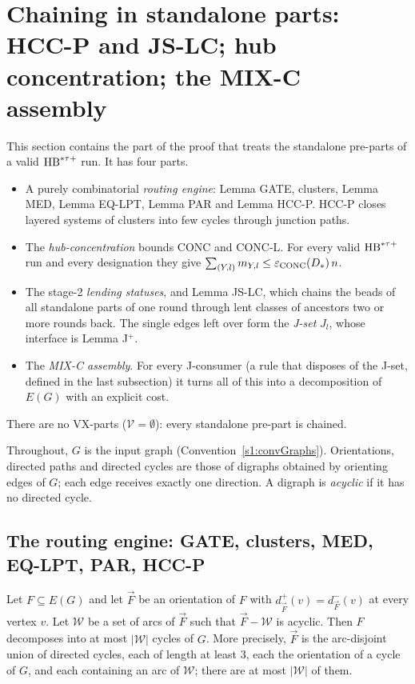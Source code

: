 \section{Chaining in standalone parts: HCC-P and JS-LC; hub concentration; the MIX-C assembly}\label{s6:sec}

This section contains the part of the proof that treats the standalone pre-parts of a valid $\mathrm{HB}^{*\tau{+}}$ run. It has four parts.
\begin{itemize}
\item A purely combinatorial \emph{routing engine}: Lemma GATE, clusters, Lemma MED, Lemma EQ-LPT, Lemma PAR and Lemma HCC-P. HCC-P closes layered systems of clusters into few cycles through junction paths.
\item The \emph{hub-concentration} bounds CONC and CONC-L. For every valid $\mathrm{HB}^{*\tau{+}}$ run and every designation they give $\sum_{(Y,l)}m_{Y,l}\le\varepsilon_{\mathrm{CONC}}(D_{*})\,n$.
\item The stage-2 \emph{lending statuses}, and Lemma JS-LC, which chains the beads of all standalone parts of one round through lent classes of ancestors two or more rounds back. The single edges left over form the \emph{J-set} $J_l$, whose interface is Lemma J$^+$.
\item The \emph{MIX-C assembly}. For every J-consumer (a rule that disposes of the J-set, defined in the last subsection) it turns all of this into a decomposition of $E(G)$ with an explicit cost.
\end{itemize}
There are no VX-parts ($\mathcal V=\emptyset$): every standalone pre-part is chained.

Throughout, $G$ is the input graph (Convention~\ref{s1:convGraphs}). Orientations, directed paths and directed cycles are those of digraphs obtained by orienting edges of $G$; each edge receives exactly one direction. A digraph is \emph{acyclic} if it has no directed cycle.

\subsection{The routing engine: GATE, clusters, MED, EQ-LPT, PAR, HCC-P}

\begin{lemma}\label{s6:lemGATE}
Let $F\subseteq E(G)$ and let $\vec F$ be an orientation of $F$ with $d^+_{\vec F}(v)=d^-_{\vec F}(v)$ at every vertex $v$. Let $\mathcal W$ be a set of arcs of $\vec F$ such that $\vec F-\mathcal W$ is acyclic. Then $F$ decomposes into at most $|\mathcal W|$ cycles of $G$. More precisely, $\vec F$ is the arc-disjoint union of directed cycles, each of length at least $3$, each the orientation of a cycle of $G$, and each containing an arc of $\mathcal W$; there are at most $|\mathcal W|$ of them.
\deps{\ref{s1:defObject}}
\end{lemma}


